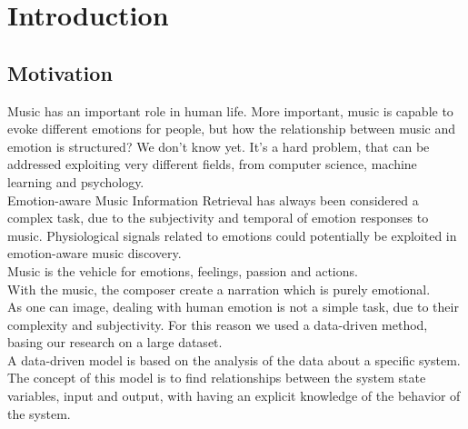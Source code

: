\chapter{Introduction}
\label{Introduction}
\pagestyle{plain}

\vspace{0.5cm}

\section{Motivation}
Music has an important role in human life. More important, music is capable to evoke different emotions for people, but how the relationship between music and emotion is structured? We don't know yet. It's a hard problem, that can be addressed exploiting very different fields, from computer science, machine learning and psychology.
\\ \indent
Emotion-aware Music Information Retrieval has always been considered a complex task, due to the subjectivity and temporal of emotion responses to music. Physiological signals related to emotions could potentially be exploited in emotion-aware music discovery.
\\ \indent
Music is the vehicle for emotions, feelings, passion and actions.
\\
With the music, the composer create a narration which is purely emotional.
\\ \indent
As one can image, dealing with human emotion is not a simple task, due to their complexity and subjectivity. For this reason we used a data-driven method, basing our research on a large dataset.
\\
A data-driven model is based on the analysis of the data about a specific system. The concept of this model is to find relationships between the system state variables, input and output, with having an explicit knowledge of the behavior of the system.

